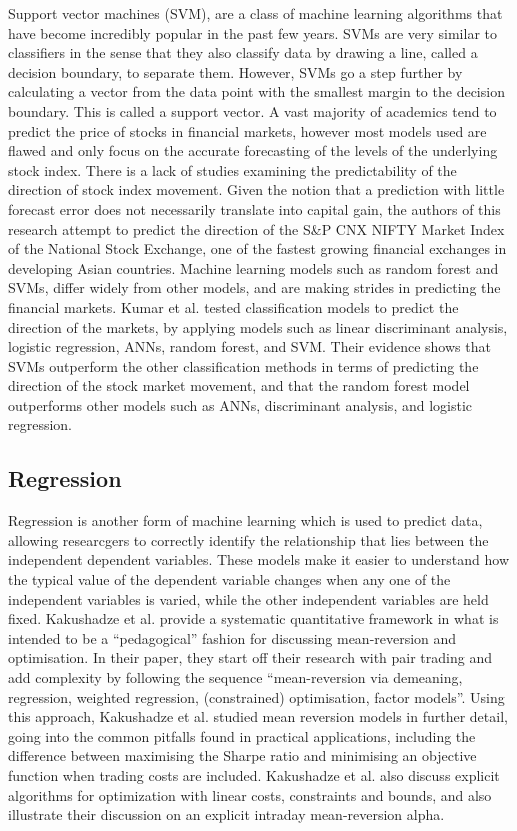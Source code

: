 Support vector machines (SVM), are a class of machine learning algorithms that have become incredibly popular in the past few years. SVMs are very similar to classifiers in the sense that they also classify data by drawing a line, called a decision boundary, to separate them. However, SVMs go a step further by calculating a vector from the data point with the smallest margin to the decision boundary. This is called a support vector. A vast majority of academics tend to predict the price of stocks in financial markets, however most models used are flawed and only focus on the accurate forecasting of the levels of the underlying stock index. There is a lack of studies examining the predictability of the direction of stock index movement. Given the notion that a prediction with little forecast error does not necessarily translate into capital gain, the authors of this research attempt to predict the direction of the S\&P CNX NIFTY Market Index of the National Stock Exchange, one of the fastest growing financial exchanges in developing Asian countries.\cite{Kumar:2016aa} Machine learning models such as random forest and SVMs, differ widely from other models, and are making strides in predicting the financial markets. Kumar et al. tested classification models to predict the direction of the markets, by applying models such as linear discriminant analysis, logistic regression, ANNs, random forest, and SVM. Their evidence shows that SVMs outperform the other classification methods in terms of predicting the direction of the stock market movement, and that the random forest model outperforms other models such as ANNs, discriminant analysis, and logistic regression.

\subsection{Regression}

Regression is another form of machine learning which is used to predict data, allowing researcgers to correctly identify the relationship that lies between the independent dependent variables. These models make it easier to understand how the typical value of the dependent variable changes when any one of the independent variables is varied, while the other independent variables are held fixed. Kakushadze et al. provide a systematic quantitative framework in what is intended to be a “pedagogical” fashion for discussing mean-reversion and optimisation.\cite{Kakushadze:2015aa} In their paper, they start off their research with pair trading and add complexity by following the sequence “mean-reversion via demeaning, regression, weighted regression, (constrained) optimisation, factor models”. Using this approach, Kakushadze et al. studied mean reversion models in further detail, going into the common pitfalls found in practical applications, including the difference between maximising the Sharpe ratio and minimising an objective function when trading costs are included. Kakushadze et al. also discuss explicit algorithms for optimization with linear costs, constraints and bounds, and also illustrate their discussion on an explicit intraday mean-reversion alpha.

